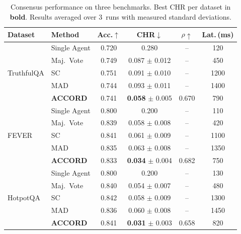 \documentclass[conference]{IEEEtran}
\begin{document}
\begin{table}[htbp]
\caption{%
  Consensus performance on three benchmarks.
  Best CHR per dataset in \textbf{bold}.
  Results averaged over 3~runs with measured standard deviations.
}
\label{tab:main}
\centering
\small
\setlength{\tabcolsep}{3pt}
\begin{tabular}{llcccc}
\toprule
Dataset & Method & Acc.$\uparrow$ & CHR$\downarrow$
                 & $\rho\uparrow$ & Lat.\,(ms) \\
\midrule
\multirow{5}{*}{TruthfulQA}
 & Single Agent    & 0.720 & 0.280          & --    & 120 \\
 & Maj.\ Vote      & 0.749 & 0.087 $\pm$ 0.012 & --    & 450 \\
 & SC              & 0.751 & 0.091 $\pm$ 0.010 & --    & 1200 \\
 & MAD             & 0.744 & 0.093 $\pm$ 0.011 & --    & 1400 \\
 & \textbf{ACCORD} & 0.741 & \textbf{0.058} $\pm$ 0.005 & 0.670 & 790 \\
\midrule
\multirow{5}{*}{FEVER}
 & Single Agent    & 0.800 & 0.200          & --    & 110 \\
 & Maj.\ Vote      & 0.839 & 0.058 $\pm$ 0.008 & --    & 420 \\
 & SC              & 0.841 & 0.061 $\pm$ 0.009 & --    & 1100 \\
 & MAD             & 0.835 & 0.063 $\pm$ 0.008 & --    & 1350 \\
 & \textbf{ACCORD} & 0.833 & \textbf{0.034} $\pm$ 0.004 & 0.682 & 750 \\
\midrule
\multirow{5}{*}{HotpotQA}
 & Single Agent    & 0.800 & 0.200          & --    & 130 \\
 & Maj.\ Vote      & 0.840 & 0.054 $\pm$ 0.007 & --    & 480 \\
 & SC              & 0.842 & 0.058 $\pm$ 0.009 & --    & 1300 \\
 & MAD             & 0.836 & 0.060 $\pm$ 0.008 & --    & 1450 \\
 & \textbf{ACCORD} & 0.841 & \textbf{0.031} $\pm$ 0.003 & 0.658 & 820 \\
\bottomrule
\end{tabular}
\end{table}
\end{document}
